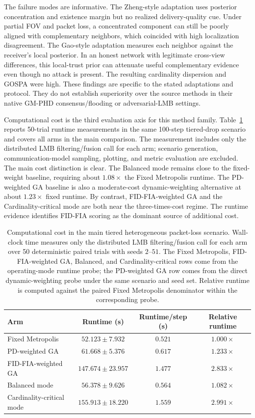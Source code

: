 The failure modes are informative. The Zheng-style adaptation uses posterior concentration and existence margin but no realized delivery-quality cue. Under partial FOV and packet loss, a concentrated component can still be poorly aligned with complementary neighbors, which coincided with high localization disagreement. The Gao-style adaptation measures each neighbor against the receiver's local posterior. In an honest network with legitimate cross-view differences, this local-trust prior can attenuate useful complementary evidence even though no attack is present. The resulting cardinality dispersion and GOSPA were high. These findings are specific to the stated adaptations and protocol. They do not establish superiority over the source methods in their native GM-PHD consensus/flooding or adversarial-LMB settings.

Computational cost is the third evaluation axis for this method family. Table~\ref{tab:runtime-cost} reports 50-trial runtime measurements in the same 100-step tiered-drop scenario and covers all arms in the main comparison. The measurement includes only the distributed LMB filtering/fusion call for each arm; scenario generation, communication-model sampling, plotting, and metric evaluation are excluded. The main cost distinction is clear. The Balanced mode remains close to the fixed-weight baseline, requiring about $1.08\times$ the Fixed Metropolis runtime. The PD-weighted GA baseline is also a moderate-cost dynamic-weighting alternative at about $1.23\times$ fixed runtime. By contrast, FID-FIA-weighted GA and the Cardinality-critical mode are both near the three-times-cost regime. The runtime evidence identifies FID-FIA scoring as the dominant source of additional cost.

\begin{table}[t]
  \centering
  \caption{Computational cost in the main tiered heterogeneous packet-loss scenario. Wall-clock time measures only the distributed LMB filtering/fusion call for each arm over 50 deterministic paired trials with seeds $2$--$51$. The Fixed Metropolis, FID-FIA-weighted GA, Balanced, and Cardinality-critical rows come from the operating-mode runtime probe; the PD-weighted GA row comes from the direct dynamic-weighting probe under the same scenario and seed set. Relative runtime is computed against the paired Fixed Metropolis denominator within the corresponding probe.}
  \label{tab:runtime-cost}
  \begin{tabular}{lccc}
    \toprule
    Arm & Runtime (s) & Runtime/step (s) & Relative runtime \\
    \midrule
    Fixed Metropolis & $52.123 \pm 7.932$ & $0.521$ & $1.000\times$ \\
    PD-weighted GA & $61.668 \pm 5.376$ & $0.617$ & $1.233\times$ \\
    FID-FIA-weighted GA & $147.674 \pm 23.957$ & $1.477$ & $2.833\times$ \\
    Balanced mode & $56.378 \pm 9.626$ & $0.564$ & $1.082\times$ \\
    Cardinality-critical mode & $155.913 \pm 18.220$ & $1.559$ & $2.991\times$ \\
    \bottomrule
  \end{tabular}
\end{table}

